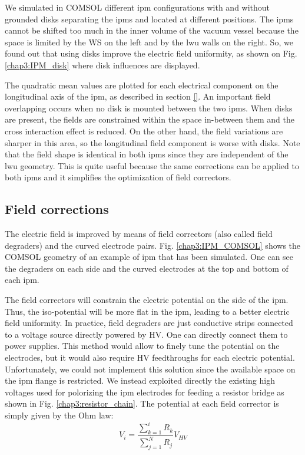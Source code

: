 \begin{refsection}
  We simulated in COMSOL different \acrshort{ipm} configurations with and without grounded disks separating the \acrshort{ipm}s and located at different positions. The \acrshort{ipm}s cannot be shifted too much in the inner volume of the vacuum vessel because the space is limited by the WS on the left and by the \acrshort{lwu} walls on the right. So, we found out that using disks improve the electric field uniformity, as shown on Fig. \ref{chap3:IPM_disk} where disk influences are displayed.

  

  The quadratic mean values are plotted for each electrical component on the longitudinal axis of the \acrshort{ipm}, as described in section \ref{}. An important field overlapping occurs when no disk is mounted between the two \acrshort{ipm}s. When disks are present, the fields are constrained within the space in-between them and the cross interaction effect is reduced. On the other hand, the field variations are sharper in this area, so the longitudinal field component is worse with disks. Note that the field shape is identical in both \acrshort{ipm}s since they are independent of the \acrshort{lwu} geometry. This is quite useful because the same corrections can be applied to both \acrshort{ipm}s and it simplifies the optimization of field correctors.

  \subsection{Field corrections}
  \label{chap3:field_corrections}
  
  The electric field is improved by means of field correctors (also called field degraders) and the curved electrode pairs. Fig. \ref{chap3:IPM_COMSOL} shows the COMSOL geometry of an example of \acrshort{ipm} that has been simulated. One can see the degraders on each side and the curved electrodes at the top and bottom of each \acrshort{ipm}.

  The field correctors will constrain the electric potential on the side of the \acrshort{ipm}. Thus, the iso-potential will be more flat in the \acrshort{ipm}, leading to a better electric field uniformity. In practice, field degraders are just conductive strips connected to a voltage
  source directly powered by HV. One can directly connect them to power supplies. This method would allow to finely tune the potential on the electrodes, but it would also require HV feedthroughs for each electric potential. Unfortunately, we could not implement this solution since the available space on the \acrshort{ipm} flange is restricted. We instead exploited directly the existing high voltages used for polorizing the \acrshort{ipm} electrodes for feeding a resistor bridge as shown in Fig. \ref{chap3:resistor_chain}. The potential at each field corrector is simply given by the Ohm law:
  \begin{equation}
    V_{i} = \frac{\sum_{k = 1}^{i} R_{k}}{\sum_{j = 1}^{N} R_{j}}V_{HV} \label{chap3:PontDiviseur}
  \end{equation}


\end{refsection}
